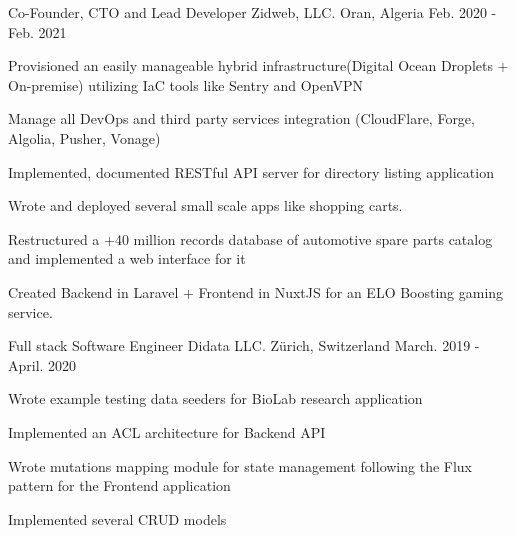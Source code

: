 \begin{cventries}
  \cventry
    {Co-Founder, CTO and Lead Developer} %
    {Zidweb, LLC.} %
    {Oran, Algeria} %
    {Feb. 2020 - Feb. 2021} %
    {
      \begin{cvitems} %
        \item {Provisioned an easily manageable hybrid infrastructure(Digital Ocean Droplets + On-premise) utilizing IaC tools like Sentry and OpenVPN}
        \item {Manage all DevOps and third party services integration (CloudFlare, Forge, Algolia, Pusher, Vonage)}
        \item {Implemented, documented RESTful API server for directory listing application}
        \item {Wrote and deployed several small scale apps like shopping carts.}
        \item {Restructured a +40 million records database of automotive spare parts catalog and implemented a web interface for it}
        \item {Created Backend in Laravel + Frontend in NuxtJS for an ELO Boosting gaming service.}
      \end{cvitems}
    }

  \cventry
    {Full stack Software Engineer} %
    {Didata LLC.} %
    {Zürich, Switzerland} %
    {March. 2019 - April. 2020} %
    {
      \begin{cvitems} %
        \item {Wrote example testing data seeders for BioLab research application}
        \item {Implemented an ACL architecture for Backend API}
        \item {Wrote mutations mapping module for state management following the Flux pattern for the Frontend application}
        \item {Implemented several CRUD models}
      \end{cvitems}
    }

\end{cventries}
